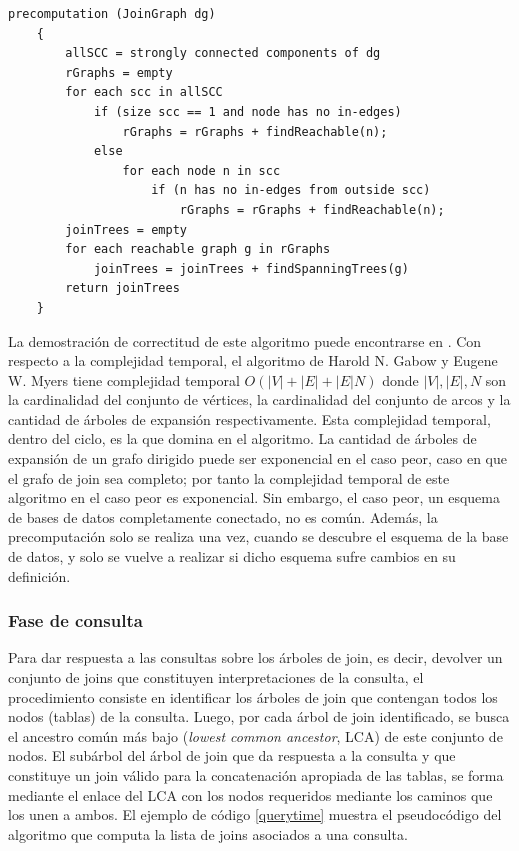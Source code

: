 \begin{lstlisting}[label={precom}, caption={Pseudoc\'odigo del proceso de precomputaci\'on (tomado de \cite{mason2005autojoin})}]
    precomputation (JoinGraph dg)
    {
        allSCC = strongly connected components of dg
        rGraphs = empty
        for each scc in allSCC
            if (size scc == 1 and node has no in-edges)
                rGraphs = rGraphs + findReachable(n);
            else
                for each node n in scc
                    if (n has no in-edges from outside scc)
                        rGraphs = rGraphs + findReachable(n);
        joinTrees = empty
        for each reachable graph g in rGraphs
            joinTrees = joinTrees + findSpanningTrees(g)
        return joinTrees
    }
\end{lstlisting}

La demostración de correctitud de este algoritmo puede encontrarse en 
\cite{mason2005autojoin}. Con respecto a la complejidad temporal, el algoritmo de Harold N. Gabow y 
Eugene W. Myers tiene complejidad temporal $O(|V| + |E| + |E|N)$ donde $|V|, |E|, N$ son la cardinalidad 
del conjunto de vértices, la cardinalidad del conjunto de arcos y la cantidad de \'arboles de expansión respectivamente. 
Esta complejidad temporal, dentro del ciclo, es la que domina en el algoritmo. La cantidad de \'arboles de 
expansión de un grafo dirigido puede ser exponencial en el caso peor, caso en que el grafo de join sea 
completo; por tanto la complejidad temporal de este algoritmo en el caso peor es exponencial. Sin embargo, 
el caso peor, un esquema de bases de datos completamente conectado, no es com\'un. Además, la precomputaci\'on 
solo se realiza una vez, 
cuando se descubre el esquema de la base de datos, y solo se vuelve a realizar si dicho 
esquema sufre cambios en su definición.

\subsubsection{Fase de consulta}

Para dar respuesta a las consultas sobre los \'arboles de join, es decir, devolver un conjunto de joins que constituyen 
interpretaciones de la consulta, el procedimiento consiste en identificar los \'arboles de join que 
contengan todos los nodos (tablas) de la consulta. Luego, por cada \'arbol de join identificado, 
se busca el ancestro com\'un m\'as bajo (\emph{lowest common ancestor}, LCA) de este conjunto de nodos. 
El sub\'arbol del \'arbol de join que da respuesta a la consulta y que constituye un join válido 
para la concatenación apropiada de las tablas, se forma mediante el enlace del LCA con los nodos requeridos 
mediante los caminos que los unen a ambos. El ejemplo de código \ref{querytime} muestra el pseudoc\'odigo 
del algoritmo que computa la lista de joins asociados a una consulta.

